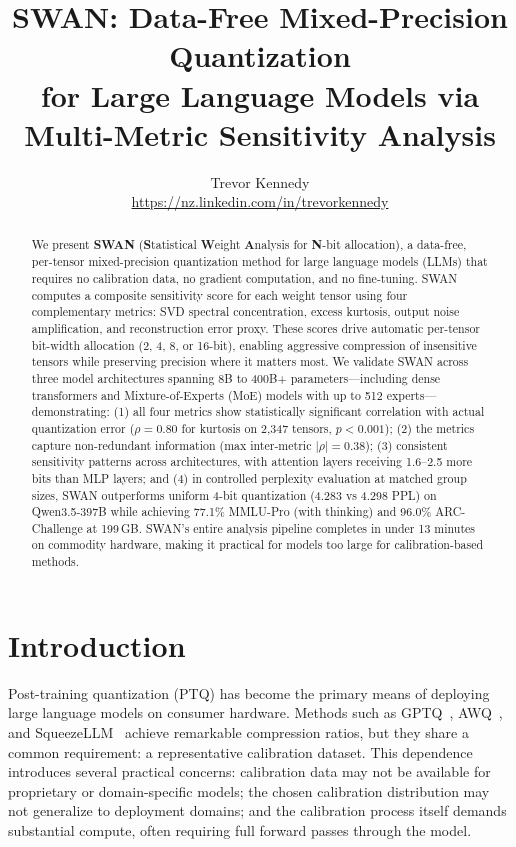 \documentclass{article}
\title{SWAN: Data-Free Mixed-Precision Quantization\\for Large Language Models via Multi-Metric Sensitivity Analysis}
\author{
  Trevor Kennedy\\
  \url{https://nz.linkedin.com/in/trevorkennedy}
}
\begin{document}
\maketitle

\begin{abstract}
We present \textbf{SWAN} (\textbf{S}tatistical \textbf{W}eight \textbf{A}nalysis for \textbf{N}-bit allocation), a data-free, per-tensor mixed-precision quantization method for large language models (LLMs) that requires no calibration data, no gradient computation, and no fine-tuning. SWAN computes a composite sensitivity score for each weight tensor using four complementary metrics: SVD spectral concentration, excess kurtosis, output noise amplification, and reconstruction error proxy. These scores drive automatic per-tensor bit-width allocation (2, 4, 8, or 16-bit), enabling aggressive compression of insensitive tensors while preserving precision where it matters most. We validate SWAN across three model architectures spanning 8B to 400B+ parameters---including dense transformers and Mixture-of-Experts (MoE) models with up to 512 experts---demonstrating: (1) all four metrics show statistically significant correlation with actual quantization error ($\rho = 0.80$ for kurtosis on 2,347 tensors, $p < 0.001$); (2) the metrics capture non-redundant information (max inter-metric $|\rho| = 0.38$); (3) consistent sensitivity patterns across architectures, with attention layers receiving 1.6--2.5 more bits than MLP layers; and (4) in controlled perplexity evaluation at matched group sizes, SWAN outperforms uniform 4-bit quantization (4.283 vs 4.298 PPL) on Qwen3.5-397B while achieving 77.1\% MMLU-Pro (with thinking) and 96.0\% ARC-Challenge at 199\,GB. SWAN's entire analysis pipeline completes in under 13 minutes on commodity hardware, making it practical for models too large for calibration-based methods.
\end{abstract}

\section{Introduction}
\label{sec:intro}

Post-training quantization (PTQ) has become the primary means of deploying large language models on consumer hardware. Methods such as GPTQ~\cite{frantar2023gptq}, AWQ~\cite{lin2024awq}, and SqueezeLLM~\cite{kim2024squeezellm} achieve remarkable compression ratios, but they share a common requirement: a representative calibration dataset. This dependence introduces several practical concerns: calibration data may not be available for proprietary or domain-specific models; the chosen calibration distribution may not generalize to deployment domains; and the calibration process itself demands substantial compute, often requiring full forward passes through the model.
\end{document}
